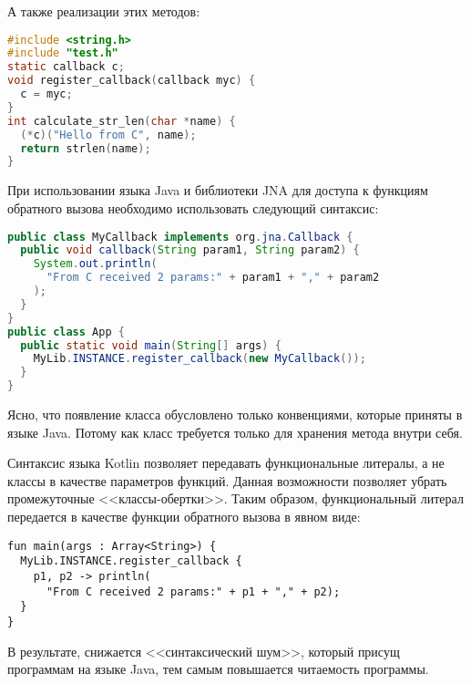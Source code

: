 \begin{code}
А также реализации этих методов:
\begin{lstlisting}[language=C, caption={Реализация функции обратного вызова из примера~\ref{callback-c-example}.}, label=callback-c-example-impl]
#include <string.h>
#include "test.h"
static callback c;
void register_callback(callback myc) {
  c = myc;
}
int calculate_str_len(char *name) {
  (*c)("Hello from C", name);
  return strlen(name);
}
\end{lstlisting}\end{code}

При использовании языка Java и библиотеки JNA для доступа к функциям обратного вызова необходимо использовать следующий синтаксис:
\begin{code}\begin{lstlisting}[language=Java, caption={Пример передачи функции обратного вызова в языке Java с использованием библиотеки JNA.}, label=java-callback-example]
public class MyCallback implements org.jna.Callback {
  public void callback(String param1, String param2) {
    System.out.println(
      "From C received 2 params:" + param1 + "," + param2
    );
  }
}
public class App {
  public static void main(String[] args) {
    MyLib.INSTANCE.register_callback(new MyCallback());
  }
}
\end{lstlisting}\end{code}

Ясно, что появление класса  обусловлено только конвенциями, которые приняты в языке Java.
Потому как класс требуется только для хранения метода  внутри себя.

Синтаксис языка Kotlin позволяет передавать функциональные литералы, а не классы в качестве параметров функций.
Данная возможности позволяет убрать промежуточные <<классы-обертки>>.
Таким образом, функциональный литерал передается в качестве функции обратного вызова в явном виде:
\begin{code}\begin{lstlisting}[caption={Пример передачи функционального литерала в качестве функции обратного вызова.}, label=kotlin-callback-example]
fun main(args : Array<String>) {
  MyLib.INSTANCE.register_callback {
    p1, p2 -> println(
      "From C received 2 params:" + p1 + "," + p2);
  }
}
\end{lstlisting}\end{code}

В результате, снижается <<синтаксический шум>>, который присущ программам на языке Java, тем самым повышается читаемость программы.

